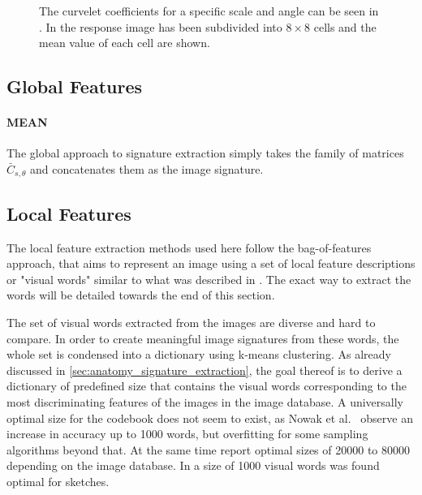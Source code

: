 \begin{figure}[h]
    \centering
    \quad
    \caption[Curvelet coefficients and means]{
        The curvelet coefficients for a specific scale and angle can be seen in
        . In
         the response image has
        been subdivided into $8 \times 8$ cells and the mean value of each cell
        are shown.
    }
    \label{fig:input_examples}
\end{figure}


\subsection{Global Features}

\paragraph{MEAN}

The global approach to signature extraction simply takes the family of matrices
$\bar{C}_{s, \theta}$ and concatenates them as the image signature.

\subsection{Local Features}

The local feature extraction methods used here follow the bag-of-features
approach, that aims to represent an image using a set of local feature
descriptions or "visual words" similar to what was described in
\autocite{sivic_video_2003}. The exact way to extract the words will be
detailed towards the end of this section.

The set of visual words extracted from the images are diverse and hard to
compare. In order to create meaningful image signatures from these words, the
whole set is condensed into a dictionary using k-means clustering. As already
discussed in \ref{sec:anatomy_signature_extraction}, the goal thereof is to
derive a dictionary of predefined size that contains the visual words
corresponding to the most discriminating features of the images in the image
database. A universally optimal size for the codebook does not seem to exist,
as Nowak et al.\ \autocite{nowak_sampling_2006} observe an increase in accuracy
up to 1000 words, but overfitting for some sampling algorithms beyond that. At
the same time \autocite{yang_evaluating_2007} report optimal sizes of 20000 to
80000 depending on the image database. In \autocite{eitz_sketch-based_2010} a
size of 1000 visual words was found optimal for sketches.

